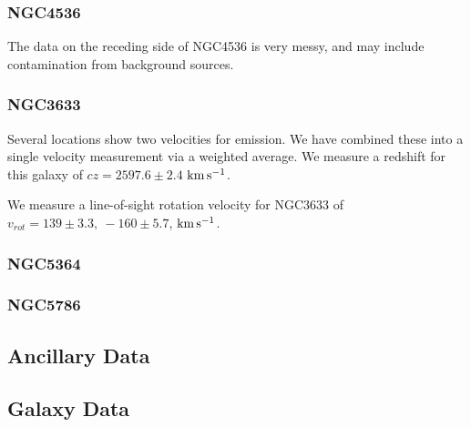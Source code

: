 \documentclass[iop]{emulateapj-rtx4}
\newcommand{\kms}{$\rm km\, s^{-1}$}
\begin{document}
\subsubsection{NGC4536}
The data on the receding side of NGC4536 is very messy, and may include contamination from background sources. 



\subsubsection{NGC3633}
Several locations show two velocities for emission. We have combined these into a single velocity measurement via a weighted average. We measure a redshift for this galaxy of $cz = 2597.6 \pm 2.4$ \kms.

We measure a line-of-sight rotation velocity for NGC3633 of $v_{rot}=139\pm 3.3,~-160\pm5.7$,  \kms.


\subsubsection{NGC5364}


\subsubsection{NGC5786}


\subsection{Ancillary Data}


\subsection{Galaxy Data}





\end{document}
